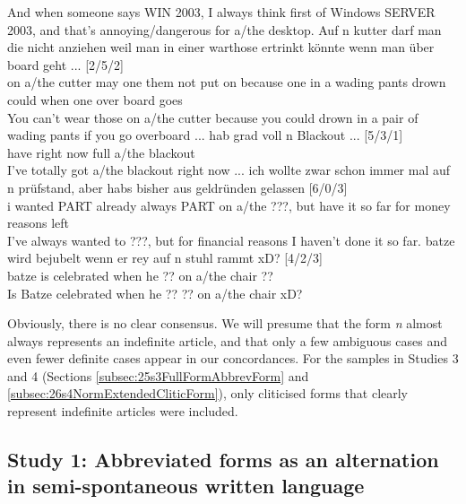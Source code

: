 \begin{exe}
\begin{xlist}
	\trans And when someone says WIN 2003, I always think first of Windows SERVER 2003, and that's annoying/dangerous for a/the desktop.
	\ex\label{ex:0019}\gll Auf n kutter darf man die nicht anziehen weil man in einer warthose ertrinkt könnte wenn man über board geht ... [2/5/2]\\
	on a/the cutter may one them not {put on} because one in a {wading pants} drown could when one over board goes\\
	\trans You can't wear those on a/the cutter because you could drown in a pair of wading pants if you go overboard ...
	\ex\label{ex:0020}\gll hab grad voll n Blackout ... [5/3/1]\\
	have {right now} full a/the blackout\\
	\trans I've totally got a/the blackout right now ...
	\ex\label{ex:0021}\gll ich wollte zwar schon immer mal auf n prüfstand, aber habs bisher aus geldründen gelassen [6/0/3]\\
	i wanted PART already always PART on a/the ???, but {have it} {so far} for {money reasons} left\\
	\trans I've always wanted to ???, but for financial reasons I haven't done it so far.
	\ex\label{ex:0022}\gll batze wird bejubelt wenn er rey auf n stuhl rammt xD? [4/2/3]\\
	batze is celebrated when he ?? on a/the chair ??\\
	Is Batze celebrated when he ?? ?? on a/the chair xD? %
	\end{xlist}
\end{exe}

Obviously, there is no clear consensus.
We will presume that the form \textit{n} almost always represents an indefinite article, and that only a few ambiguous cases and even fewer definite cases appear in our concordances.
For the samples in Studies 3 and 4 (Sections \ref{subsec:25s3FullFormAbbrevForm} and \ref{subsec:26s4NormExtendedCliticForm}), only cliticised forms that clearly represent indefinite articles were included.

\subsection[Study 1: Abbreviated forms as an alternation]{Study 1: Abbreviated forms as an alternation in semi-spontaneous written language}
\label{subsec:23s1Alternation}

